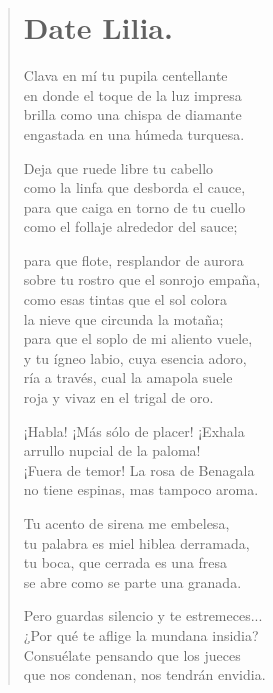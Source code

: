 \documentclass[12pt, twoside]{book}
\begin{document}
\newpage
\begin{verse}
\begin{center}
\section{Date Lilia.}
\end{center}
Clava en mí tu pupila centellante\\
en donde el toque de la luz impresa\\
brilla como una chispa de diamante\\
engastada en una húmeda turquesa.
\newline

Deja que ruede libre tu cabello\\
como la linfa que desborda el cauce,\\
para que caiga en torno de tu cuello\\
como el follaje alrededor del sauce;
\newline

para que flote, resplandor de aurora\\
sobre tu rostro que el sonrojo empaña,\\
como esas tintas que el sol colora\\
la nieve que circunda la motaña;\\

para que el soplo de mi aliento vuele,\\
y tu ígneo labio, cuya esencia adoro,\\
ría a través, cual la amapola suele\\
roja y vivaz en el trigal de oro.
\newline

¡Habla! ¡Más sólo de placer! ¡Exhala\\
arrullo nupcial de la paloma!\\
¡Fuera de temor! La rosa de Benagala\\
no tiene espinas, mas tampoco aroma.
\newline

Tu acento de sirena me embelesa,\\
tu palabra es miel hiblea derramada,\\
tu boca, que cerrada es una fresa\\
se abre como se parte una granada.
\newline

Pero guardas silencio y te estremeces...\\
¿Por qué te aflige la mundana insidia?\\
Consuélate pensando que los jueces \\
que nos condenan, nos tendrán envidia.
\newpage


\end{verse}
\end{document}
